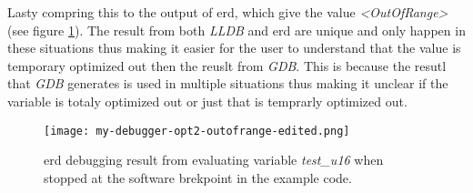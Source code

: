 Lasty compring this to the output of \gls{erd}, which give the value \emph{<OutOfRange>}(see figure \ref{fig:mydebuggeroutofrange}).
The result from both \emph{LLDB} and \gls{erd} are unique and only happen in these situations thus making it easier for the user to understand that the value is temporary optimized out then the reuslt from \emph{GDB}.
This is because the resutl that \emph{GDB} generates is used in multiple situations thus making it unclear if the variable is totaly optimized out or just that is temprarly optimized out.


\begin{figure}[h]
    \centering
    \texttt{[image: my-debugger-opt2-outofrange-edited.png]}
	\caption{\gls{erd} debugging result from evaluating variable \emph{test\_u16} when stopped at the software brekpoint in the example code.}
    \label{fig:mydebuggeroutofrange}
\end{figure}

